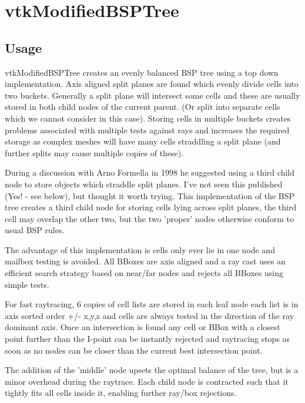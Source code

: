 \section{vtkModifiedBSPTree}

\subsection{Usage}

 vtkModifiedBSPTree creates an evenly balanced BSP tree using a top down
 implementation. Axis aligned split planes are found which evenly divide
 cells into two buckets. Generally a split plane will intersect some cells
 and these are usually stored in both child nodes of the current parent.
 (Or split into separate cells which we cannot consider in this case).
 Storing cells in multiple buckets creates problems associated with multiple
 tests against rays and increases the required storage as complex meshes
 will have many cells straddling a split plane (and further splits may
 cause multiple copies of these).

 During a discussion with Arno Formella in 1998 he suggested using
 a third child node to store objects which straddle split planes. I've not
 seen this published (Yes! - see below), but thought it worth trying. This
 implementation of the BSP tree creates a third child node for storing cells
 lying across split planes, the third cell may overlap the other two, but the
 two 'proper' nodes otherwise conform to usual BSP rules.

 The advantage of this implementation is cells only ever lie in one node
 and mailbox testing is avoided. All BBoxes are axis aligned and a ray cast
 uses an efficient search strategy based on near/far nodes and rejects
 all BBoxes using simple tests.

 For fast raytracing, 6 copies of cell lists are stored in each leaf node
 each list is in axis sorted order +/- x,y,z and cells are always tested
 in the direction of the ray dominant axis. Once an intersection is found
 any cell or BBox with a closest point further than the I-point can be
 instantly rejected and raytracing stops as soon as no nodes can be closer
 than the current best intersection point.

 The addition of the 'middle' node upsets the optimal balance of the tree,
 but is a minor overhead during the raytrace. Each child node is contracted
 such that it tightly fits all cells inside it, enabling further ray/box
 rejections.

